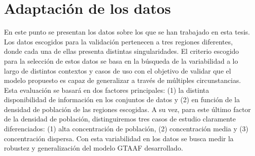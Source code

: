 	








\section{Adaptación de los datos}
\label{DATA_PRESENTATION_RESULTS}


En este punto se presentan los datos sobre los que se han trabajado en esta tesis. Los datos escogidos para la validación pertenecen a tres regiones diferentes, donde cada una de ellas presenta distintas singularidades. El criterio escogido para la selección de estos datos se basa en la búsqueda de la variabilidad a lo largo de distintos contextos y casos de uso con el objetivo de validar que el modelo propuesto es capaz de generalizar a través de múltiples circunstancias. Esta evaluación se basará en dos factores principales: (1) la distinta disponibilidad de información en los conjuntos de datos y (2) en función de la densidad de población de las regiones escogidas. A su vez, para este último factor de la densidad de población, distinguiremos tres casos de estudio claramente diferenciados: (1) alta concentración de población, (2) concentración media y (3) concentración dispersa. Con esta variabilidad en los datos se busca medir la robustez y generalización del modelo GTAAF desarrollado.



